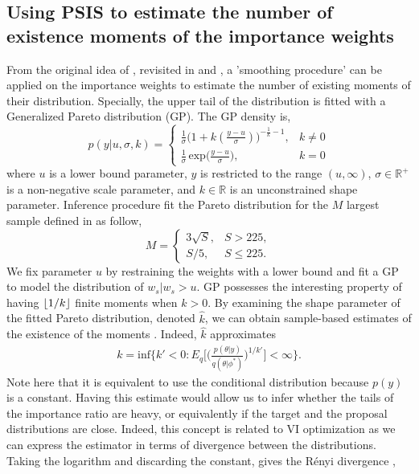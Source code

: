 \documentclass[twoside]{article}
\DeclarePairedDelimiter\floor{\lfloor}{\rfloor}
\begin{document}
\subsection{Using PSIS to estimate the number of existence moments of the importance weights}
From the original idea of \citep{Koopman:2009aa}, revisited in \citep{Vehtari:2017aa} and \citep{2015arXiv150702646V}, a 'smoothing procedure' can be applied on the importance weights to estimate the number of existing moments of their distribution. Specially, the upper tail of the distribution is fitted with a Generalized Pareto distribution (GP). The GP density is,
\begin{equation}
    p(y |u, \sigma, k) = 
\begin{cases}
\frac{1} {\sigma} \big(1 + k (\frac{y - u} {\sigma}) \big)^{-\frac{1}{k} -1}, & k \neq 0 \\
\frac{1} {\sigma} \,\textrm{exp} \big(\frac{y - u}{\sigma}\big), & k = 0
\end{cases} 
\end{equation}
where $u$ is a lower bound parameter, $y$ is restricted to the range $(u, \infty)$, $\sigma \in \mathbb{R}^+$ is a non-negative scale parameter, and $k \in \mathbb{R}$ is an unconstrained shape parameter. Inference procedure fit the Pareto distribution for the $M$ largest sample defined in \citep{2015arXiv150702646V} as follow, 
\begin{equation}
    M = 
\begin{cases}
3\sqrt{S}, & S > 225, \\
S/5, & S \leq 225.
\end{cases} 
\end{equation} 
We fix parameter $u$ by restraining the weights with a lower bound and fit a GP to model the distribution of $w_s|w_s > u$. GP possesses the interesting property of having $\floor*{1/k}$ finite moments when $k > 0$. By examining the shape parameter of the fitted Pareto distribution, denoted $\hat{k}$, we can obtain sample-based estimates of the existence of the moments \citep{Koopman:2009aa}. Indeed, $\hat{k}$ approximates
\begin{align}
    k = \text{inf}\bigg\{k' < 0: E_q \Big[\Big(\frac {p(\theta|y)} {q(\theta|\phi^*)} \Big)^{1/k'} \Big] < \infty\bigg\}.
\end{align}
Note here that it is equivalent to use the conditional distribution because $p(y)$ is a constant. Having this estimate would allow us to infer whether the tails of the importance ratio are heavy, or equivalently if the target and the proposal distributions are close. Indeed, this concept is related to VI optimization as we can express the estimator in terms of divergence between the distributions. Taking the logarithm and discarding the constant, gives the Rényi divergence \citet{Renyia:1961},
\end{document}
